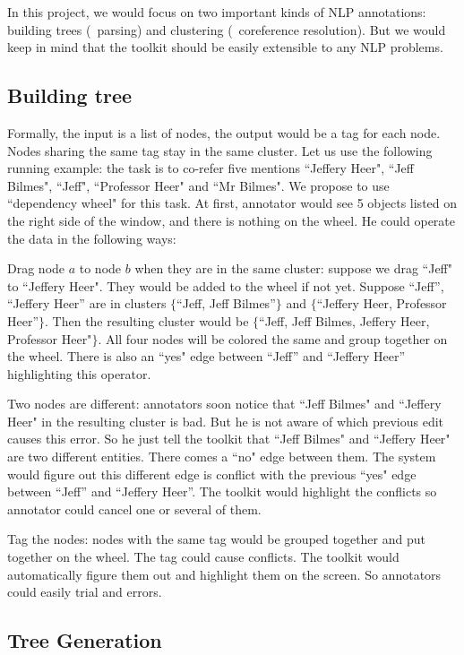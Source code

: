 In this project, we would focus on two important kinds of NLP
annotations: building trees (\eg\  parsing) and clustering (\eg\
coreference resolution). But we would keep in mind that the toolkit
should be easily extensible to any NLP problems.

\subsection{Building tree}

Formally, the input is a list of nodes, the output would be a tag for
each node. Nodes sharing the same tag stay in the same cluster. Let us
use the following running example: the task is to co-refer five
mentions ``Jeffery Heer", ``Jeff Bilmes", ``Jeff", ``Professor Heer"
and ``Mr Bilmes". We propose to use ``dependency wheel" for this task.
At first, annotator would see 5 objects listed on the right side of
the window, and there is nothing on the wheel. He could operate the
data in the following ways:

Drag node $a$ to node $b$ when they are in the same cluster: suppose
we drag ``Jeff" to ``Jeffery Heer". They would be added to the wheel
if not yet. Suppose ``Jeff'', ``Jeffery Heer'' are in clusters
  $\{$``Jeff, Jeff Bilmes''$\}$ and $\{$``Jeffery Heer, Professor
  Heer''$\}$. Then the resulting cluster would be $\{$``Jeff, Jeff
  Bilmes, Jeffery Heer, Professor Heer"$\}$. All four nodes will be
  colored the same and group together on the wheel. There is also an
  ``yes" edge between ``Jeff'' and ``Jeffery Heer'' highlighting this
  operator.

Two nodes are different: annotators soon notice that ``Jeff Bilmes"
and ``Jeffery Heer" in the resulting cluster is bad. But he is not
aware of which previous edit causes this error. So he just tell the
toolkit that ``Jeff Bilmes" and ``Jeffery Heer" are two different
entities. There comes a ``no" edge between them. The system would
figure out this different edge is conflict with the previous ``yes"
edge between ``Jeff'' and ``Jeffery Heer''. The toolkit would
highlight the conflicts so annotator could cancel one or several of
them.

Tag the nodes: nodes with the same tag would be grouped together and
put together on the wheel. The tag could cause conflicts. The toolkit
would automatically figure them out and highlight them on the screen.
So annotators could easily trial and errors.


\subsection{Tree Generation}

